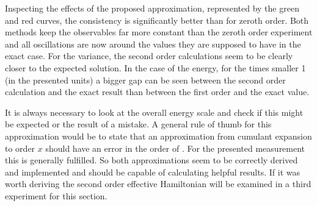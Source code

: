 Inspecting the effects of the proposed approximation, represented by the green and red curves, the consistency is significantly better than for zeroth order.
Both methods keep the observables far more constant than the zeroth order experiment and all oscillations are now around the values they are supposed to have in the exact case.
For the variance, the second order calculations seem to be clearly closer to the expected solution.
In the case of the energy, for the times smaller 1 (in the presented units) a bigger gap can be seen between the second order calculation and the exact result than between the first order and the exact value.

It is always necessary to look at the overall energy scale and check if this might be expected or the result of a mistake.
A general rule of thumb for this approximation would be to state that an approximation from cumulant expansion to order $x$ should have an error in the order of . 
For the presented measurement this is generally fulfilled. 
So both approximations seem to be correctly derived and implemented and should be capable of calculating helpful results.
If it was worth deriving the second order effective Hamiltonian will be examined in a third experiment for this section.


